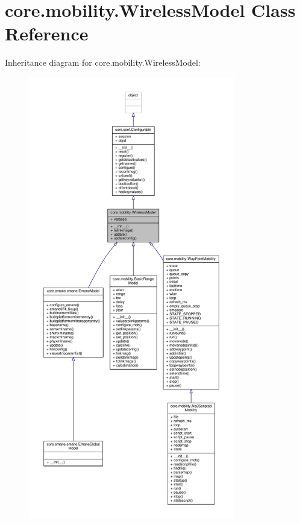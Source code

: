 \hypertarget{classcore_1_1mobility_1_1_wireless_model}{\section{core.\+mobility.\+Wireless\+Model Class Reference}
\label{classcore_1_1mobility_1_1_wireless_model}
}


Inheritance diagram for core.\+mobility.\+Wireless\+Model\+:
\nopagebreak
\begin{figure}[H]
\begin{center}
\leavevmode
\includegraphics[height=550pt]{classcore_1_1mobility_1_1_wireless_model__inherit__graph}
\end{center}
\end{figure}


